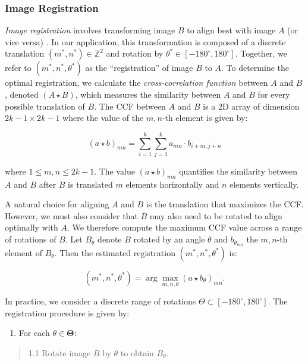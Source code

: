 \documentclass[11pt,]{isuthesis}
\providecommand{\tightlist}{%
  \setlength{\itemsep}{0pt}\setlength{\parskip}{0pt}}
\begin{document}
\hypertarget{image-registration}{%
\subsubsection{Image Registration}\label{image-registration}}

\emph{Image registration} involves transforming image \(B\) to align best with image \(A\) (or vice versa) \citep{Brown1992}.
In our application, this transformation is composed of a discrete translation \((m^*,n^*) \in \mathbb{Z}^2\) and rotation by \(\theta^* \in [-180^\circ, 180^\circ]\).
Together, we refer to \((m^*,n^*,\theta^*)\) as the ``registration'' of image \(B\) to \(A\).
To determine the optimal registration, we calculate the \emph{cross-correlation function} between \(A\) and \(B\), denoted \((A \star B)\), which measures the similarity between \(A\) and \(B\) for every possible translation of \(B\).
The CCF between \(A\) and \(B\) is a 2D array of dimension \(2k - 1 \times 2k - 1\) where the value of the \(m,n\)-th element is given by:

\[
(a \star b)_{mn} = \sum_{i=1}^k \sum_{j=1}^k a_{mn} \cdot b_{i + m,j + n}
\]

where \(1 \leq m,n \leq 2k -1\).
The value \((a \star b)_{mn}\) quantifies the similarity between \(A\) and \(B\) after \(B\) is translated \(m\) elements horizontally and \(n\) elements vertically.

A natural choice for aligning \(A\) and \(B\) is the translation that maximizes the CCF.
However, we must also consider that \(B\) may also need to be rotated to align optimally with \(A\).
We therefore compute the maximum CCF value across a range of rotations of \(B\).
Let \(B_\theta\) denote \(B\) rotated by an angle \(\theta\) and \(b_{\theta_{mn}}\) the \(m,n\)-th element of \(B_\theta\). Then the estimated registration \((m^*, n^*, \theta^*)\) is:

\[
(m^*, n^*, \theta^*) = \arg \max_{m,n,\theta} (a \star b_{\theta})_{mn}.
\]

In practice, we consider a discrete range of rotations \(\Theta \subset [-180^\circ, 180^\circ]\).
The registration procedure is given by:

\begin{enumerate}
\def\labelenumi{\arabic{enumi}.}
\tightlist
\item
  For each \(\theta \in \pmb{\Theta}\):
\end{enumerate}

\begin{quote}
1.1 Rotate image \(B\) by \(\theta\) to obtain \(B_\theta\).
\end{quote}
\end{document}
